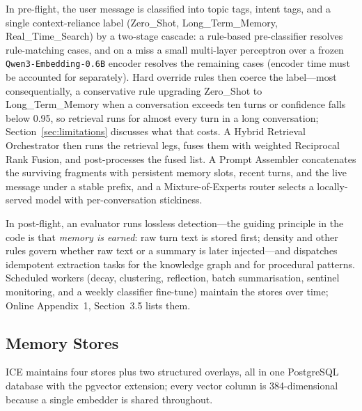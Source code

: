 \documentclass[twoside,11pt]{article}
\begin{document}
In pre-flight, the user message is classified into topic tags, intent tags, and a single context-reliance label (Zero\_Shot, Long\_Term\_Memory, Real\_Time\_Search) by a two-stage cascade: a rule-based pre-classifier resolves rule-matching cases, and on a miss a small multi-layer perceptron over a frozen \texttt{Qwen3-Embedding-0.6B} encoder resolves the remaining cases (encoder time must be accounted for separately). Hard override rules then coerce the label---most consequentially, a conservative rule upgrading Zero\_Shot to Long\_Term\_Memory when a conversation exceeds ten turns or confidence falls below 0.95, so retrieval runs for almost every turn in a long conversation; Section~\ref{sec:limitations} discusses what that costs. A Hybrid Retrieval Orchestrator then runs the retrieval legs, fuses them with weighted Reciprocal Rank Fusion, and post-processes the fused list. A Prompt Assembler concatenates the surviving fragments with persistent memory slots, recent turns, and the live message under a stable prefix, and a Mixture-of-Experts router selects a locally-served model with per-conversation stickiness.

In post-flight, an evaluator runs lossless detection---the guiding principle in the code is that \emph{memory is earned}: raw turn text is stored first; density and other rules govern whether raw text or a summary is later injected---and dispatches idempotent extraction tasks for the knowledge graph and for procedural patterns. Scheduled workers (decay, clustering, reflection, batch summarisation, sentinel monitoring, and a weekly classifier fine-tune) maintain the stores over time; Online Appendix~1, Section~3.5 lists them.

\subsection{Memory Stores}

ICE maintains four stores plus two structured overlays, all in one PostgreSQL database with the pgvector extension; every vector column is 384-dimensional because a single embedder is shared throughout.
\end{document}
